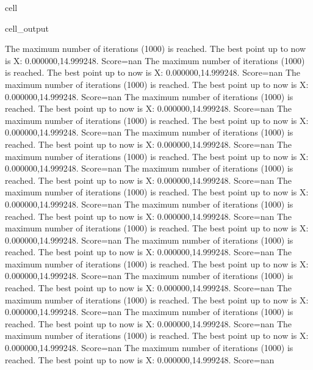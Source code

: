 \documentclass[letterpaper,10pt,english]{jupyterBook}
\begin{document}
\begin{sphinxuseclass}{cell}
\begin{sphinxVerbatimOutput}
\begin{sphinxuseclass}{cell_output}
\begin{sphinxVerbatim}[commandchars=\\\{\}]
The maximum number of iterations (1000) is reached. The best point up to now is X: \PYGZob{}0.000000,14.999248\PYGZcb{}. Score=\PYGZhy{}nan
The maximum number of iterations (1000) is reached. The best point up to now is X: \PYGZob{}0.000000,14.999248\PYGZcb{}. Score=\PYGZhy{}nan
The maximum number of iterations (1000) is reached. The best point up to now is X: \PYGZob{}0.000000,14.999248\PYGZcb{}. Score=\PYGZhy{}nan
The maximum number of iterations (1000) is reached. The best point up to now is X: \PYGZob{}0.000000,14.999248\PYGZcb{}. Score=\PYGZhy{}nan
The maximum number of iterations (1000) is reached. The best point up to now is X: \PYGZob{}0.000000,14.999248\PYGZcb{}. Score=\PYGZhy{}nan
The maximum number of iterations (1000) is reached. The best point up to now is X: \PYGZob{}0.000000,14.999248\PYGZcb{}. Score=\PYGZhy{}nan
The maximum number of iterations (1000) is reached. The best point up to now is X: \PYGZob{}0.000000,14.999248\PYGZcb{}. Score=\PYGZhy{}nan
The maximum number of iterations (1000) is reached. The best point up to now is X: \PYGZob{}0.000000,14.999248\PYGZcb{}. Score=\PYGZhy{}nan
The maximum number of iterations (1000) is reached. The best point up to now is X: \PYGZob{}0.000000,14.999248\PYGZcb{}. Score=\PYGZhy{}nan
The maximum number of iterations (1000) is reached. The best point up to now is X: \PYGZob{}0.000000,14.999248\PYGZcb{}. Score=\PYGZhy{}nan
The maximum number of iterations (1000) is reached. The best point up to now is X: \PYGZob{}0.000000,14.999248\PYGZcb{}. Score=\PYGZhy{}nan
The maximum number of iterations (1000) is reached. The best point up to now is X: \PYGZob{}0.000000,14.999248\PYGZcb{}. Score=\PYGZhy{}nan
The maximum number of iterations (1000) is reached. The best point up to now is X: \PYGZob{}0.000000,14.999248\PYGZcb{}. Score=\PYGZhy{}nan
The maximum number of iterations (1000) is reached. The best point up to now is X: \PYGZob{}0.000000,14.999248\PYGZcb{}. Score=\PYGZhy{}nan
The maximum number of iterations (1000) is reached. The best point up to now is X: \PYGZob{}0.000000,14.999248\PYGZcb{}. Score=\PYGZhy{}nan
The maximum number of iterations (1000) is reached. The best point up to now is X: \PYGZob{}0.000000,14.999248\PYGZcb{}. Score=\PYGZhy{}nan
The maximum number of iterations (1000) is reached. The best point up to now is X: \PYGZob{}0.000000,14.999248\PYGZcb{}. Score=\PYGZhy{}nan
The maximum number of iterations (1000) is reached. The best point up to now is X: \PYGZob{}0.000000,14.999248\PYGZcb{}. Score=\PYGZhy{}nan

\end{sphinxVerbatim}
\end{sphinxuseclass}
\end{sphinxVerbatimOutput}
\end{sphinxuseclass}
\end{document}
